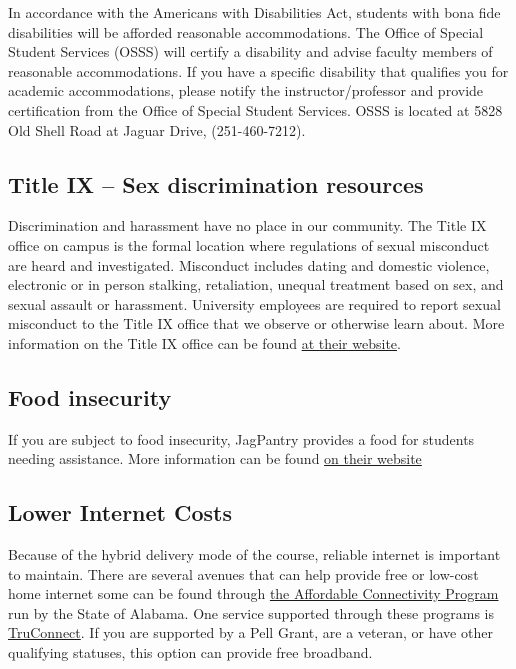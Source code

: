\documentclass[11pt,]{article}
\begin{document}
In accordance with the Americans with Disabilities Act, students with
bona fide disabilities will be afforded reasonable accommodations. The
Office of Special Student Services (OSSS) will certify a disability and
advise faculty members of reasonable accommodations. If you have a
specific disability that qualifies you for academic accommodations,
please notify the instructor/professor and provide certification from
the Office of Special Student Services. OSSS is located at 5828 Old
Shell Road at Jaguar Drive, (251-460-7212).

\hypertarget{title-ix-sex-discrimination-resources}{%
\subsection{Title IX -- Sex discrimination
resources}\label{title-ix-sex-discrimination-resources}}

Discrimination and harassment have no place in our community. The Title
IX office on campus is the formal location where regulations of sexual
misconduct are heard and investigated. Misconduct includes dating and
domestic violence, electronic or in person stalking, retaliation,
unequal treatment based on sex, and sexual assault or harassment.
University employees are required to report sexual misconduct to the
Title IX office that we observe or otherwise learn about. More
information on the Title IX office can be found
\href{https://www.southalabama.edu/departments/studentaffairs/titlenine/}{at
their website}.

\hypertarget{food-insecurity}{%
\subsection{Food insecurity}\label{food-insecurity}}

If you are subject to food insecurity, JagPantry provides a food for
students needing assistance. More information can be found
\href{https://www.southalabama.edu/departments/sga/foodpantry.html}{on
their website}

\hypertarget{lower-internet-costs}{%
\subsection{Lower Internet Costs}\label{lower-internet-costs}}

Because of the hybrid delivery mode of the course, reliable internet is
important to maintain. There are several avenues that can help provide
free or low-cost home internet some can be found through
\href{https://adeca.alabama.gov/affordable-connectivity-program/}{the
Affordable Connectivity Program} run by the State of Alabama. One
service supported through these programs is
\href{https://www.truconnect.com/findhelp}{TruConnect}. If you are
supported by a Pell Grant, are a veteran, or have other qualifying
statuses, this option can provide free broadband.
\end{document}
